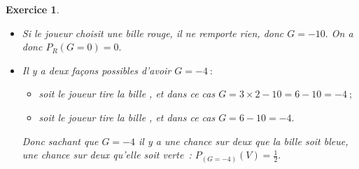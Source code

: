 \documentclass[10pt]{article}
\newtheorem{exo}{Exercice}
\begin{document}
\begin{exo}
\begin{enumerate}
\begin{itemize}
Conclusion~: $P(G=5)=\frac{2}{15}.$

\item[\textbullet] Si le joueur choisit une bille rouge, il ne remporte rien, donc $G=-10.$ On a donc $P_R(G = 0)=0.$
\item[\textbullet] Il y a deux façons possibles d'avoir $G=-4~:$
\begin{itemize}
\item soit le joueur tire la bille \black, et dans ce cas $G=3\times 2-10=6-10=-4~;$
\item soit le joueur tire la bille \black, et dans ce cas $G=6-10=-4.$
\end{itemize}
Donc sachant que $G=-4$ il y a une chance sur deux que la bille soit bleue, une chance sur deux qu'elle soit verte~: $P_{(G = - 4)}(V)=\frac{1}{2}.$
\end{itemize}
\end{enumerate}


\end{exo}
\end{document}
